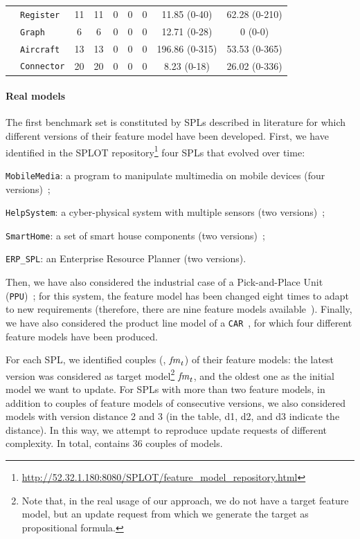 \begin{tikzborder}{\cite{Gargantini16:validation}}
\begin{tikzborder}{\cite{gargantini_combinatorial_2017}}
\begin{tikzborder}{\cite{garn2019}}
\begin{tikzborder}{\cite{arcaini2019achieving}}
\begin{table}[!htb]
{\begin{tabular}{clcc|ccccc}
				& {\tt Register} & 11 & 11 & 0 & 0 & 0 & 11.85 (0-40) & 62.28 (0-210)\\
				& {\tt Graph} & 6 & 6 & 0 & 0 & 0 & 12.71 (0-28) & 0 (0-0)\\
				&{\tt Aircraft} & 13 & 13 & 0 & 0 & 0 & 196.86 (0-315) & 53.53 (0-365)\\
				& {\tt Connector} & 20 & 20 & 0 & 0 & 0 & 8.23 (0-18) & 26.02 (0-336)\\
				\bottomrule
			\end{tabular}
		}
		\label{tab:benchmarks}
	\end{table}
	
	\paragraph{Real models}
	\bb The first benchmark set \benchReal is constituted by SPLs described in literature for which different versions of their feature model have been developed. First, we have identified in the SPLOT repository\footnote{\url{http://52.32.1.180:8080/SPLOT/feature_model_repository.html}} four SPLs that evolved over time:
	\begin{compactitem}
		\item {\tt MobileMedia}: a program to manipulate multimedia on mobile devices (four versions)~\cite{multimediaPaper};
		\item {\tt HelpSystem}: a cyber-physical system with multiple sensors (two versions)~\cite{helpSystemPaper};
		\item {\tt SmartHome}: a set of smart house components (two versions)~\cite{smartHomePaper};
		\item {\tt ERP\_SPL}: an Enterprise Resource Planner (two versions).
	\end{compactitem}
	Then, we have also considered the industrial case of a Pick-and-Place Unit ({\tt PPU})~\cite{Burdek2016}; for this system, the feature model has been changed eight times to adapt to new requirements (therefore, there are nine feature models available~\cite{Burdek2016}). Finally, we have also considered the product line model of a {\tt CAR}~\cite{Pleuss2012}, for which four different feature models have been produced.
	
	For each SPL, we identified couples (\initFm, $\mathit{fm}_t$) of their feature models: the latest version was considered as target model\footnote{Note that, in the real usage of our approach, we do not have a target feature model, but an update request \UR from which we generate the target as propositional formula.} $\mathit{fm}_t$, and the oldest one as the initial model \initFm we want to update. For SPLs with more than two feature models, in addition to couples of feature models of consecutive versions, we also considered models with version distance 2 and 3 (in the table, d1, d2, and d3 indicate the distance). In this way, we attempt to reproduce update requests of different complexity. In total, \benchReal contains 36 couples of models.\be
	

\end{tikzborder}
\end{tikzborder}
\end{tikzborder}
\end{tikzborder}
